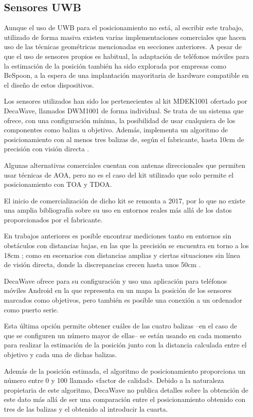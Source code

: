 \subsection{Sensores UWB}

Aunque el uso de UWB para el posicionamiento no está, al escribir este trabajo, utilizado de forma masiva existen varias implementaciones comerciales que hacen uso de las técnicas geométricas mencionadas en secciones anteriores.
A pesar de que el uso de sensores propios es habitual, la adaptación de teléfonos móviles para la estimación de la posición también ha sido explorada por empresas como BeSpoon, a la espera de una implantación mayoritaria de hardware compatible en el diseño de estos dispositivos.

Los sensores utilizados han sido los pertenecientes al kit MDEK1001 ofertado por DecaWave, llamados DWM1001 de forma individual.
Se trata de un sistema que ofrece, con una configuración mínima, la posibilidad de usar cualquiera de los componentes como baliza u objetivo.
Además, implementa un algoritmo de posicionamiento con al menos tres balizas de, según el fabricante, hasta 10cm de precisión con visión directa \cite{Decawave}.

Algunas alternativas comerciales cuentan con antenas direccionales que permiten usar técnicas de AOA, pero no es el caso del kit utilizado que solo permite el posicionamiento con TOA y TDOA.

El inicio de comercialización de dicho kit se remonta a 2017, por lo que no existe una amplia bibliografía sobre su uso en entornos reales más allá de los datos proporcionados por el fabricante.

En trabajos anteriores es posible encontrar mediciones tanto en entornos sin obstáculos con distancias bajas, en las que la precisión se encuentra en torno a los 18cm \cite{Simedroni}; como en escenarios con distancias amplias y ciertas situaciones sin línea de visión directa, donde la discrepancias crecen hasta unos 50cm \cite{jimenez, kulmer}.

DecaWave ofrece para su configuración y uso una aplicación para teléfonos móviles Android en la que representa en un mapa la posición de los sensores marcados como objetivos, pero también es posible una conexión a un ordenador como puerto serie.

Esta última opción permite obtener cuáles de las cuatro balizas --en el caso de que se configuren un número mayor de ellas-- se están usando en cada momento para realizar la estimación de la posición junto con la distancia calculada entre el objetivo y cada una de dichas balizas.

Además de la posición estimada, el algoritmo de posicionamiento proporciona un número entre 0 y 100 llamado «factor de calidad».
Debido a la naturaleza propietaria de este algoritmo, DecaWave no publica detalles sobre la obtención de este dato más allá de ser una comparación entre el posicionamiento obtenido con tres de las balizas y el obtenido al introducir la cuarta.

